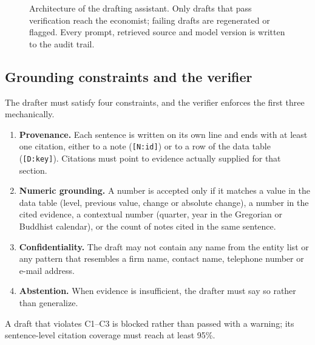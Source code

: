 \documentclass[11pt]{article}
\begin{document}
\begin{figure}[tbp]
\caption{Architecture of the drafting assistant. Only drafts that pass verification reach the economist; failing drafts are regenerated or flagged. Every prompt, retrieved source and model version is written to the audit trail.}
\label{fig:architecture}
\end{figure}

\subsection{Grounding constraints and the verifier}
The drafter must satisfy four constraints, and the verifier enforces the first three mechanically.
\begin{enumerate}[label=\textbf{C\arabic*.},leftmargin=2.6em]
\item \textbf{Provenance.} Each sentence is written on its own line and ends with at least one citation, either to a note (\texttt{[N:id]}) or to a row of the data table (\texttt{[D:key]}). Citations must point to evidence actually supplied for that section.
\item \textbf{Numeric grounding.} A number is accepted only if it matches a value in the data table (level, previous value, change or absolute change), a number in the cited evidence, a contextual number (quarter, year in the Gregorian or Buddhist calendar), or the count of notes cited in the same sentence.
\item \textbf{Confidentiality.} The draft may not contain any name from the entity list or any pattern that resembles a firm name, contact name, telephone number or e-mail address.
\item \textbf{Abstention.} When evidence is insufficient, the drafter must say so rather than generalize.
\end{enumerate}
A draft that violates C1--C3 is blocked rather than passed with a warning; its sentence-level citation coverage must reach at least 95\%.
\end{document}
